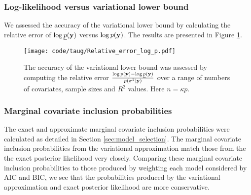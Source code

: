 \documentclass{amsart}[12pt]
\begin{document}
\subsubsection{Log-likelihood versus variational lower bound}

We assessed the accuracy of the variational lower bound by calculating the relative error of
$\log{\underline{p}({\bf y})}$ versus $\log{p({\bf y})}$. The results are presented in Figure
\ref{fig:relative_error}.

\begin{figure}[p]
	\texttt{[image: code/taug/Relative\_error\_log\_p.pdf]}
	\caption{The accuracy of the variational lower bound was assessed by computing the relative error
		$\frac{\log p({\bf y}) - \log \underline{p}({\bf y})}{p(\sigma^2 | {\bf y})}$ over a range
		of numbers of covariates, sample sizes and $R^2$  values. Here $n = \kappa p$.}
	\label{fig:relative_error}
\end{figure}




\subsubsection{Marginal covariate inclusion probabilities}

The exact and approximate marginal covariate inclusion probabilities were calculated as detailed in Section
\ref{sec:model_selection}. The marginal covariate inclusion probabilities from the variational approximation
match those from the the exact posterior likelihood very closely. Comparing these marginal covariate inclusion
probabilities to those produced by weighting each model considered by AIC and BIC, we see that the
probabilities produced by the variational approximation and exact posterior likelihood are more conservative.
\end{document}
